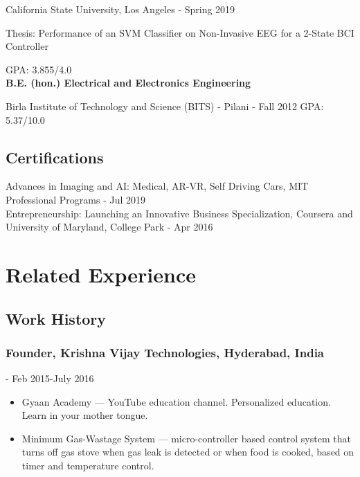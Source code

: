 \documentclass{article}
\begin{document}
\noindent   
California State University, Los Angeles - Spring 2019

\noindent   
Thesis: Performance of an SVM Classifier on Non-Invasive EEG for a 2-State BCI Controller 

\noindent
GPA: 3.855/4.0 \\


\noindent
\textbf{B.E. (hon.) Electrical and Electronics Engineering}

\noindent
Birla Institute of Technology and Science (BITS) - Pilani - Fall 2012
\noindent
GPA: 5.37/10.0


\subsection{Certifications}
Advances in Imaging and AI: Medical, AR-VR, Self Driving Cars, MIT Professional Programs - Jul 2019\\

\noindent
Entrepreneurship: Launching an Innovative Business Specialization, Coursera and University of Maryland, College Park - Apr 2016


\section{Related Experience}
\subsection{Work History}

\subsubsection{Founder, Krishna Vijay Technologies, Hyderabad, India} - Feb 2015-July 2016
\begin{itemize}
    \item Gyaan Academy --- YouTube education channel. Personalized education. Learn in your mother tongue.
    \item Minimum Gas-Wastage System --- micro-controller based control system that turns off gas stove when gas leak is detected or when food is cooked, based on timer and temperature control.
\end{itemize}
    
\end{document}
